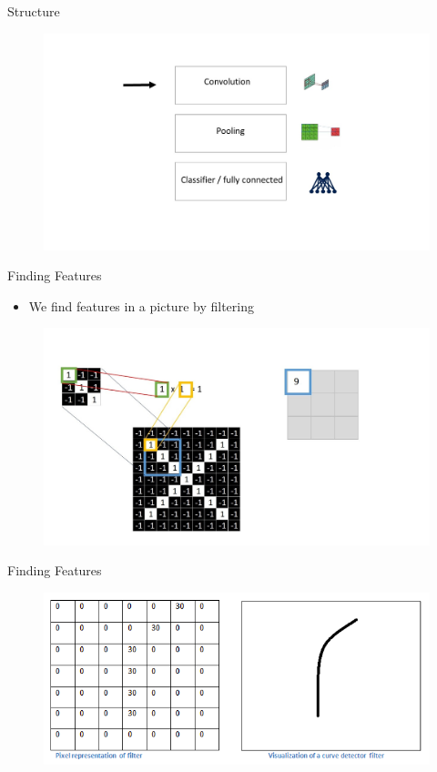 \documentclass[12pt]{beamer}
\begin{document}
\begin{frame}{Structure}
\begin{figure}
\includegraphics[width = 1\linewidth]{images/struct1.jpg}
\label{fig:principle}
\end{figure}
\end{frame}

\begin{frame}{Finding Features}
  \begin{itemize}
  \item We find features in a picture by filtering

  \end{itemize}
\begin{figure}
\includegraphics[width = 0.8\linewidth]{images/convolution.jpg}
\label{fig:principle}
\end{figure}
\end{frame}

\begin{frame}{Finding Features}
\begin{figure}
\includegraphics[width = 0.8\linewidth]{images/Filter.png}
\label{fig:principle}
\end{figure}
\end{frame}
\end{document}
